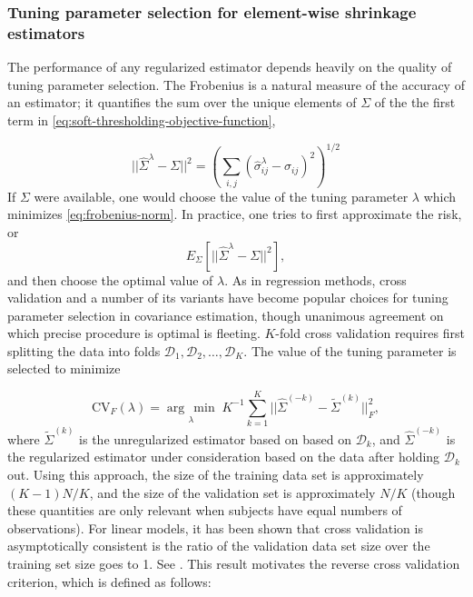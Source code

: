 \documentclass[12pt]{article}
\newcommand{\argmin}[1]{\underset{#1}{\operatorname{arg}\,\operatorname{min}}\;}
\theoremstyle{definition}
\begin{document}
\subsubsection{Tuning parameter selection for element-wise shrinkage estimators}

The performance of any regularized estimator depends heavily on the quality of tuning parameter selection. The Frobenius is a natural measure of the accuracy of an estimator; it quantifies the sum over the unique elements of $\Sigma$ of the the first term in \ref{eq:soft-thresholding-objective-function}, 

\begin{equation} \label{eq:forbenius-norm}
\vert \vert  \hat{\Sigma}^\lambda - \Sigma \vert \vert^2 = \left(\sum_{i,j} \left(\hat{\sigma}^\lambda_{ij} - \sigma_{ij} \right)^2\right)^{1/2}
\end{equation}
\noindent
If $\Sigma$ were available, one would choose the value of the tuning parameter $\lambda$ which minimizes \ref{eq:frobenius-norm}. In practice, one tries to first approximate the risk, or 
\[
E_\Sigma\left[\vert \vert  \hat{\Sigma}^\lambda - \Sigma \vert \vert^2 \right],
\]
\noindent
and then choose the optimal value of $\lambda$.  As in regression methods, cross validation and a number of its variants have become popular choices for tuning parameter selection in covariance estimation, though unanimous agreement on which precise procedure is optimal is fleeting.  $K$-fold cross validation requires first splitting the data into folds $\mathcal{D}_1, \mathcal{D}_2, \dots, \mathcal{D}_K$. The value of the tuning parameter is selected to minimize

\begin{equation} \label{eq:K-fold-matrix--cv}
\mbox{CV}_F\left(\lambda \right) = \argmin{\lambda} K^{-1} \sum_{k = 1}^K  \vert \vert\hat{\Sigma}^{\left(-k\right)} - \tilde{\Sigma}^{\left(k\right)}  \vert \vert_F^2, 
\end{equation}
\noindent
where $\tilde{\Sigma}^{\left(k\right)}$ is the unregularized estimator based on based on $\mathcal{D}_k$, and $\hat{\Sigma}^{\left(-k\right)}$ is the regularized estimator under consideration based on the data after holding $\mathcal{D}_k$ out.  Using this approach, the size of the training data set is approximately $\left(K - 1 \right)N/K$, and the size of the validation set is approximately $N/K$ (though these quantities are only relevant when subjects have equal numbers of observations). For linear models, it has been shown that cross validation is asymptotically consistent is the ratio of the validation data set size over the training set size goes to 1. See \citet{shao1993linear}. This result motivates the reverse cross validation criterion, which is defined as follows:
\end{document}
